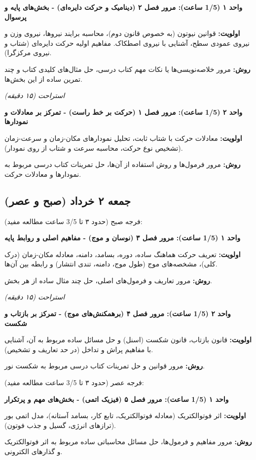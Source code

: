 \documentclass[12pt]{article}
\newcommand{\unithead}[1]{\par\vspace{1ex}\noindent\textbf{#1}\par\nopagebreak[4]\vspace{0.5ex}}
\newcommand{\休息}[1]{\par\centering\textit{#1}\par\vspace{1ex}} %
\begin{document}
\unithead{واحد ۱ (1/5 ساعت): مرور فصل ۲ (دینامیک و حرکت دایره‌ای) - بخش‌های پایه و پرسوال}
\noindent\textbf{اولویت: }قوانین نیوتون (به خصوص قانون دوم)، محاسبه برایند نیروها، نیروی وزن و نیروی عمودی سطح، آشنایی با نیروی اصطکاک. مفاهیم اولیه حرکت دایره‌ای (شتاب و نیروی مرکزگرا).
\par\noindent\textbf{روش: }مرور خلاصه‌نویسی‌ها یا نکات مهم کتاب درسی، حل مثال‌های کلیدی کتاب و چند تمرین ساده از این بخش‌ها.

\休息{استراحت (۱۵ دقیقه)}

\unithead{واحد ۲ (1/5 ساعت): مرور فصل ۱ (حرکت بر خط راست) - تمرکز بر معادلات و نمودارها}
\noindent\textbf{اولویت: }معادلات حرکت با شتاب ثابت، تحلیل نمودارهای مکان-زمان و سرعت-زمان (تشخیص نوع حرکت، محاسبه سرعت و شتاب از روی نمودار).
\par\noindent\textbf{روش: }مرور فرمول‌ها و روش استفاده از آن‌ها، حل تمرینات کتاب درسی مربوط به نمودارها و معادلات حرکت.

\subsection*{جمعه ۲ خرداد (صبح و عصر)}
فرجه صبح (حدود ۳ تا 3/5 ساعت مطالعه مفید):

\unithead{واحد ۱ (1/5 ساعت): مرور فصل ۳ (نوسان و موج) - مفاهیم اصلی و روابط پایه}
\noindent\textbf{اولویت: }تعریف حرکت هماهنگ ساده، دوره، بسامد، دامنه، معادله مکان-زمان (درک کلی)، مشخصه‌های موج (طول موج، دامنه، تندی انتشار) و رابطه بین آن‌ها.
\par\noindent\textbf{روش: }مرور تعاریف و فرمول‌های اصلی، حل چند مثال ساده از هر بخش.

\休息{استراحت (۱۵ دقیقه)}

\unithead{واحد ۲ (1/5 ساعت): مرور فصل ۴ (برهمکنش‌های موج) - تمرکز بر بازتاب و شکست}
\noindent\textbf{اولویت: }قانون بازتاب، قانون شکست (اسنل) و حل مسائل ساده مربوط به آن، آشنایی با مفاهیم پراش و تداخل (در حد تعاریف و تشخیص).
\par\noindent\textbf{روش: }مرور قوانین و حل تمرینات کتاب درسی مربوط به شکست نور.

\vspace{1em}
فرجه عصر (حدود ۳ تا 3/5 ساعت مطالعه مفید):

\unithead{واحد ۱ (1/5 ساعت): مرور فصل ۵ (فیزیک اتمی) - بخش‌های مهم و پرتکرار}
\noindent\textbf{اولویت: }اثر فوتوالکتریک (معادله فوتوالکتریک، تابع کار، بسامد آستانه)، مدل اتمی بور (ترازهای انرژی، گسیل و جذب فوتون).
\par\noindent\textbf{روش: }مرور مفاهیم و فرمول‌ها، حل مسائل محاسباتی ساده مربوط به اثر فوتوالکتریک و گذارهای الکترونی.
\end{document}
